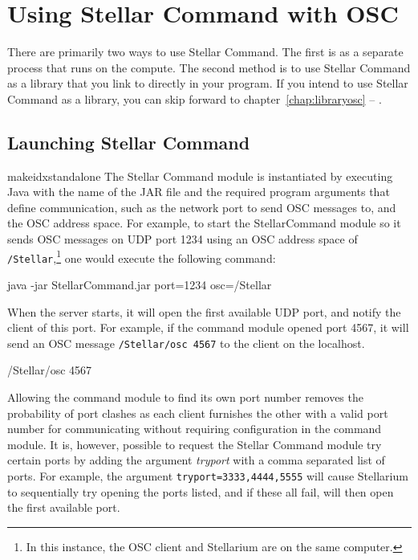 \chapter{Using Stellar Command with OSC} \label{chap:launchosc}
There are primarily two ways to use Stellar Command. The first is as a separate process that runs on the compute. The second method is to use Stellar Command as a library that you link to directly in your program. If you intend to use Stellar Command as a library, you can skip forward to chapter~\ref{chap:libraryosc} --
\emph{}.


\section{Launching Stellar Command} \label{sec:launchcommand}
makeidx{standalone}
The Stellar Command module is instantiated by executing Java  with the name of the JAR file and the required program arguments that define communication, such as the network port to send OSC messages to, and the OSC address space.  For example, to start the StellarCommand module so it sends OSC messages on UDP port 1234  using an OSC address space of \texttt{/Stellar},\footnote{In this instance, the OSC client and Stellarium are on the same computer.} one would execute the following command:\\

\begin{syntax}
\medskip
	java -jar StellarCommand.jar port=1234 osc=/Stellar  \\
\medskip
\end{syntax}
\bigskip
   When the server starts, it will open the first available UDP port, and notify the client of this port. For example, if the command module opened port 4567, it will send an OSC message \texttt{/Stellar/osc 4567} to the client on the localhost. 
   
\begin{syntax}
\medskip
	/Stellar/osc 4567  \\
\medskip
\end{syntax}
\bigskip

Allowing the command module to find its own port number removes the probability of port clashes as each client furnishes the other with a valid port number for communicating without requiring configuration in the command module. It is, however, possible to request the Stellar Command module try certain ports by adding the argument \textit{tryport}  with a comma separated list of ports. For example, the argument \texttt{tryport=3333,4444,5555} will cause Stellarium to sequentially try opening the ports listed, and if these all fail, will then open the first available port.\\
   
